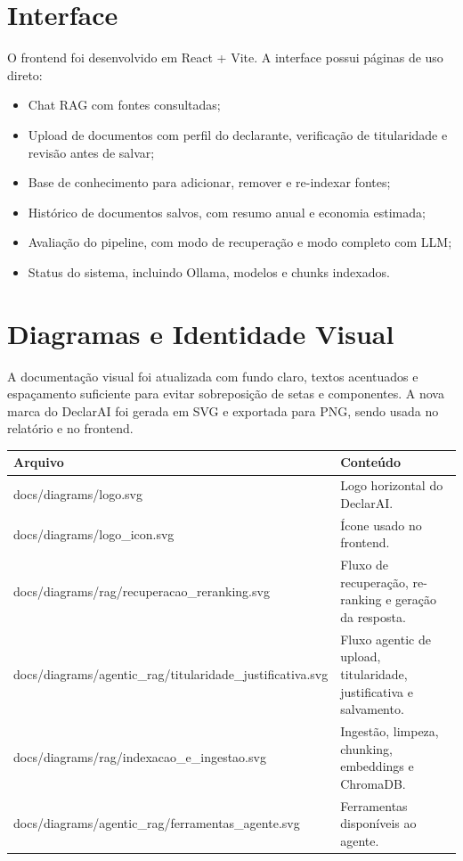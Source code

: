 \documentclass[11pt,a4paper,oneside]{article}
\begin{document}
\section{Interface}

O frontend foi desenvolvido em React + Vite. A interface possui páginas de uso direto:

\begin{itemize}[leftmargin=7mm]
  \item Chat RAG com fontes consultadas;
  \item Upload de documentos com perfil do declarante, verificação de titularidade e revisão antes de salvar;
  \item Base de conhecimento para adicionar, remover e re-indexar fontes;
  \item Histórico de documentos salvos, com resumo anual e economia estimada;
  \item Avaliação do pipeline, com modo de recuperação e modo completo com LLM;
  \item Status do sistema, incluindo Ollama, modelos e chunks indexados.
\end{itemize}

\section{Diagramas e Identidade Visual}

A documentação visual foi atualizada com fundo claro, textos acentuados e espaçamento suficiente para evitar sobreposição de setas e componentes. A nova marca do DeclarAI foi gerada em SVG e exportada para PNG, sendo usada no relatório e no frontend.

\begin{center}
\begin{tabularx}{\textwidth}{@{}>{\raggedright\arraybackslash\ttfamily\scriptsize}p{92mm}Y@{}}
\toprule
\textbf{Arquivo} & \textbf{Conteúdo} \\
\midrule
docs/diagrams/logo.svg & Logo horizontal do DeclarAI. \\
docs/diagrams/logo\_icon.svg & Ícone usado no frontend. \\
docs/diagrams/rag/recuperacao\_reranking.svg & Fluxo de recuperação, re-ranking e geração da resposta. \\
docs/diagrams/agentic\_rag/titularidade\_justificativa.svg & Fluxo agentic de upload, titularidade, justificativa e salvamento. \\
docs/diagrams/rag/indexacao\_e\_ingestao.svg & Ingestão, limpeza, chunking, embeddings e ChromaDB. \\
docs/diagrams/agentic\_rag/ferramentas\_agente.svg & Ferramentas disponíveis ao agente. \\
\bottomrule
\end{tabularx}
\end{center}
\end{document}
